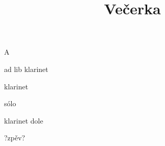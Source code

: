 \documentclass[timestamp]{jazzgrid}
\title{Večerka}
\begin{document}
\maketitle
\begin{musicsection}{A}
\barline
	{\barfour{}
		{}
		{}
		{}
		{}
	}
	{\barfour{}
		{}
		{}
		{}
		{}
	}
	{\barfour{}
		{}
		{}
		{}
		{}
	}
	{\barfour{}
		{}
		{}
		{}
		{}
	}
\barline
	{\barfour{}
		{}
		{}
		{}
		{}
	}
	{\barfour{}
		{}
		{}
		{}
		{}
	}
	{\barfour{}
		{}
		{}
		{}
		{}
	}
	{\barfour{}
		{}
		{}
		{}
		{}
	}
\barline
	{\barfour{}
		{}
		{}
		{}
		{}
	}
	{\barfour{}
		{}
		{}
		{}
		{}
	}
	{\barfour{}
		{}
		{}
		{}
		{}
	}
	{\barfour{}
		{}
		{}
		{}
		{}
	}
\barline
	{\barfour{}
		{}
		{}
		{}
		{}
	}
	{\barfour{}
		{}
		{}
		{}
		{}
	}
	{\barfour{}
		{}
		{}
		{}
		{}
	}
	{\barfour{}
		{}
		{}
		{}
		{}
	}
\end{musicsection}

\begin{multicols*}{2}
	\begin{description}[noitemsep,align=right,labelwidth=\widthof{\bfseries{\scriptsize AA}}]
	\scriptsize
	\item [A] ad lib klarinet
	\item [A] klarinet
	\item [AA] sólo
	\item [A] klarinet dole
	\item [A] ?zpěv?
\end{description}
\vfill\null
\columnbreak
\end{multicols*}
\end{document}
